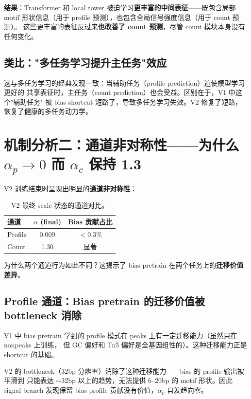 \documentclass[11pt,a4paper]{ctexart}
\begin{document}
\textbf{结果}：Transformer 和 local tower 被迫学习\textbf{更丰富的中间表征}——既包含局部
motif 形状信息（用于 profile 预测），也包含全局信号强度信息（用于 count 预测）。
这些更丰富的表征反过来\textbf{也改善了 count 预测}，尽管 count 模块本身没有任何变化。

\subsection{类比："多任务学习提升主任务"效应}

这与多任务学习的经典发现一致：当辅助任务（profile prediction）迫使模型学习更好的
共享表征时，主任务（count prediction）也会受益。区别在于，V1 中这个"辅助任务"
被 bias shortcut 短路了，导致多任务学习失效。V2 修复了短路，恢复了健康的多任务动力学。

\section{机制分析二：通道非对称性——为什么 $\alpha_p \to 0$ 而 $\alpha_c$ 保持 1.3}

V2 训练结束时呈现出明显的\textbf{通道非对称性}：

\begin{table}[H]
\centering
\small
\caption{V2 最终 scale 状态的通道对比。}
\begin{tabular}{lcc}
\toprule
通道 & $\alpha$ (final) & Bias 贡献占比 \\
\midrule
Profile & 0.009 & $< 0.3\%$ \\
Count & 1.30 & 显著 \\
\bottomrule
\end{tabular}
\end{table}

为什么两个通道行为如此不同？这揭示了 bias pretrain 在两个任务上的\textbf{迁移价值差异}。

\subsection{Profile 通道：Bias pretrain 的迁移价值被 bottleneck 消除}

V1 中 bias pretrain 学到的 profile 模式在 peaks 上有一定迁移能力（虽然只在 nonpeaks 上训练，
但 GC 偏好和 Tn5 偏好是全基因组性的）。这种迁移能力正是 shortcut 的基础。

V2 的 bottleneck（32bp 分辨率）消除了这种迁移能力——bias 的 profile 输出被平滑到
只能表达 $\sim$32bp 以上的趋势，无法提供 6--20bp 的 motif 形状。因此 signal branch
发现保留 bias profile 贡献没有价值，$\alpha_p$ 自发趋向零。
\end{document}
